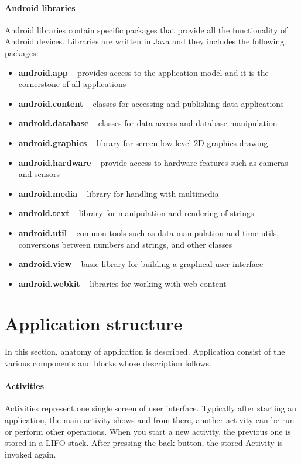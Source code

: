 \paragraph{Android libraries}
Android libraries contain specific packages that provide all the functionality of Android devices. Libraries are written in Java and they includes the following packages:

\begin{itemize}
\item \textbf{android.app} -- provides access to the application model and it is the cornerstone of all applications
\item \textbf{android.content} -- classes for accessing and publishing data applications
\item \textbf{android.database} -- classes for data access and database manipulation 
\item \textbf{android.graphics} -- library for screen low-level 2D graphics drawing
\item \textbf{android.hardware} -- provide access to hardware features such as cameras and sensors
\item \textbf{android.media} -- library for handling with multimedia 
\item \textbf{android.text} -- library for manipulation and rendering of strings
\item \textbf{android.util} -- common tools such as data manipulation and time utils, conversions between numbers and strings, and other classes
\item \textbf{android.view} -- basic library for building a graphical user interface
\item \textbf{android.webkit} -- libraries for working with web content
\end{itemize}

\section{Application structure}\label{AppStructure}
In this section, anatomy of application is described. Application consist of the various components and blocks whose description follows.

\paragraph{Activities}
Activities represent one single screen of user interface. Typically after starting an application, the main activity shows and from there, another activity can be run or perform other operations. When you start a new activity, the previous one is stored in a LIFO stack. After pressing the back button, the stored Activity is invoked again.

